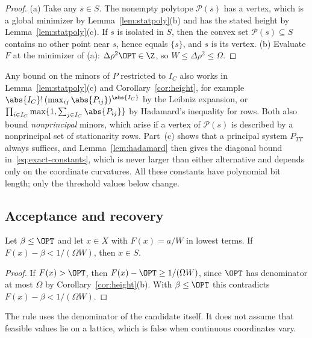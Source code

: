 \begin{proof}
(a) Take any $s\in S$. The nonempty polytope $\mathcal P(s)$ has a vertex,
which is a global minimizer by Lemma~\ref{lem:statpoly}(b) and has the
stated height by Lemma~\ref{lem:statpoly}(c). If $s$ is isolated in $S$, then
the convex set $\mathcal P(s)\subseteq S$ contains no other point near $s$,
hence equals $\{s\}$, and $s$ is its vertex.
(b) Evaluate $F$ at the minimizer of (a): $\Delta\rho^2\OPT\in\Z$, so
$W\le \Delta\rho^2\le \Omega$.
\end{proof}

\begin{remark}\label{rem:heights}
Any bound on the minors of $P$ restricted to $I_C$ also works in
Lemma~\ref{lem:statpoly}(c) and Corollary~\ref{cor:height}, for example
$\abs{I_C}!\,(\max_{ij}\abs{P_{ij}})^{\abs{I_C}}$ by the Leibniz expansion, or
$\prod_{i\in I_C}\max\{1,\sum_{j\in I_C}\abs{P_{ij}}\}$ by Hadamard's
inequality for rows. Both also bound \emph{nonprincipal} minors, which arise
if a vertex of $\mathcal P(s)$ is described by a nonprincipal set of
stationarity rows. Part~(c) shows that a principal system $P_{TT}$ always
suffices, and Lemma~\ref{lem:hadamard} then gives the diagonal bound
in~\eqref{eq:exact-constants}, which is never larger than either
alternative and depends only on the coordinate curvatures. All these
constants have polynomial bit length; only the threshold values below
change.
\end{remark}

\subsection{Acceptance and recovery}

\begin{proposition}\label{prop:accept}
Let $\beta\le\OPT$ and let $x\in X$ with $F(x)=a/W$ in lowest terms. If
$F(x)-\beta<1/(\Omega W)$, then $x\in S$.
\end{proposition}

\begin{proof}
If $F(x)>\OPT$, then $F(x)-\OPT\ge1/(\Omega W)$, since $\OPT$ has denominator at
most $\Omega$ by Corollary~\ref{cor:height}(b). With $\beta\le\OPT$ this
contradicts $F(x)-\beta<1/(\Omega W)$.
\end{proof}

The rule uses the denominator of the candidate itself. It does not assume
that feasible values lie on a lattice, which is false when continuous
coordinates vary.

